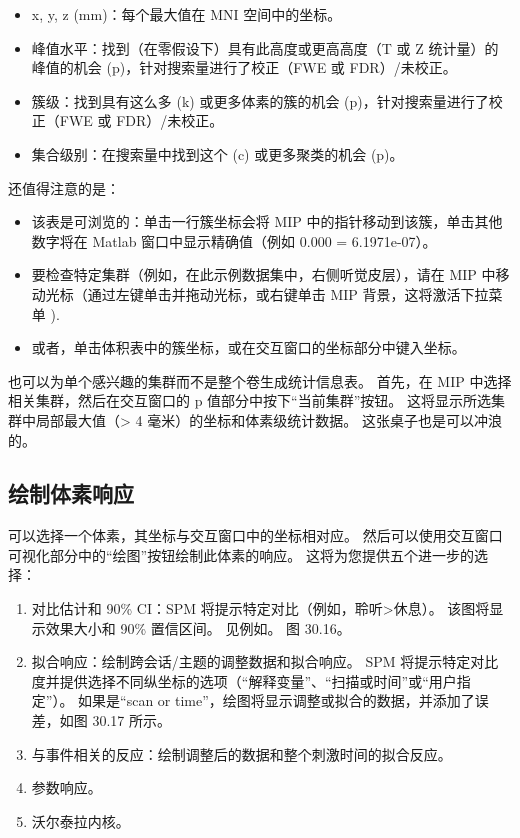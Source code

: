 \begin{itemize}
	\item x, y, z (mm)：每个最大值在 MNI 空间中的坐标。
	\item 峰值水平：找到（在零假设下）具有此高度或更高高度（T 或 Z 统计量）的峰值的机会 (p)，针对搜索量进行了校正（FWE 或 FDR）/未校正。
	\item 簇级：找到具有这么多 (k) 或更多体素的簇的机会 (p)，针对搜索量进行了校正（FWE 或 FDR）/未校正。
	\item 集合级别：在搜索量中找到这个 (c) 或更多聚类的机会 (p)。
\end{itemize}

还值得注意的是：

\begin{itemize}
	\item 该表是可浏览的：单击一行簇坐标会将 MIP 中的指针移动到该簇，单击其他数字将在 Matlab 窗口中显示精确值（例如 0.000 = 6.1971e-07）。
	\item 要检查特定集群（例如，在此示例数据集中，右侧听觉皮层），请在 MIP 中移动光标（通过左键单击并拖动光标，或右键单击 MIP 背景，这将激活下拉菜单 ).
	\item 或者，单击体积表中的簇坐标，或在交互窗口的坐标部分中键入坐标。
\end{itemize}

也可以为单个感兴趣的集群而不是整个卷生成统计信息表。 首先，在 MIP 中选择相关集群，然后在交互窗口的 p 值部分中按下“当前集群”按钮。 这将显示所选集群中局部最大值（> 4 毫米）的坐标和体素级统计数据。 这张桌子也是可以冲浪的。

\subsection{绘制体素响应}
可以选择一个体素，其坐标与交互窗口中的坐标相对应。 然后可以使用交互窗口可视化部分中的“绘图”按钮绘制此体素的响应。 这将为您提供五个进一步的选择：

\begin{enumerate}
	\item 对比估计和 90\% CI：SPM 将提示特定对比（例如，聆听>休息）。 该图将显示效果大小和 90\% 置信区间。 见例如。 图 30.16。
	\item 拟合响应：绘制跨会话/主题的调整数据和拟合响应。 SPM 将提示特定对比度并提供选择不同纵坐标的选项（“解释变量”、“扫描或时间”或“用户指定”）。 如果是“scan or time”，绘图将显示调整或拟合的数据，并添加了误差，如图 30.17 所示。
	\item 与事件相关的反应：绘制调整后的数据和整个刺激时间的拟合反应。
	\item 参数响应。
	\item 沃尔泰拉内核。
\end{enumerate}

